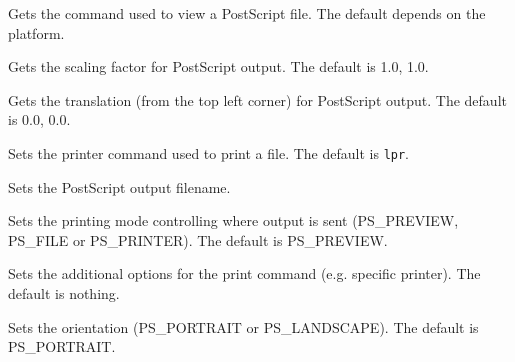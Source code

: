 \label{wxgetprinterpreviewcommand}


Gets the command used to view a PostScript file. The default depends on the platform.


\label{wxgetprinterscaling}


Gets the scaling factor for PostScript output. The default is 1.0, 1.0.


\label{wxgetprintertranslation}


Gets the translation (from the top left corner) for PostScript output. The default is 0.0, 0.0.


\label{wxsetprintercommand}


Sets the printer command used to print a file. The default is {\tt lpr}.


\label{wxsetprinterfile}


Sets the PostScript output filename.


\label{wxsetprintermode}


Sets the printing mode controlling where output is sent (PS\_PREVIEW, PS\_FILE or PS\_PRINTER).
The default is PS\_PREVIEW.


\label{wxsetprinteroptions}


Sets the additional options for the print command (e.g. specific printer). The default is nothing.


\label{wxsetprinterorientation}


Sets the orientation (PS\_PORTRAIT or PS\_LANDSCAPE). The default is PS\_PORTRAIT.


